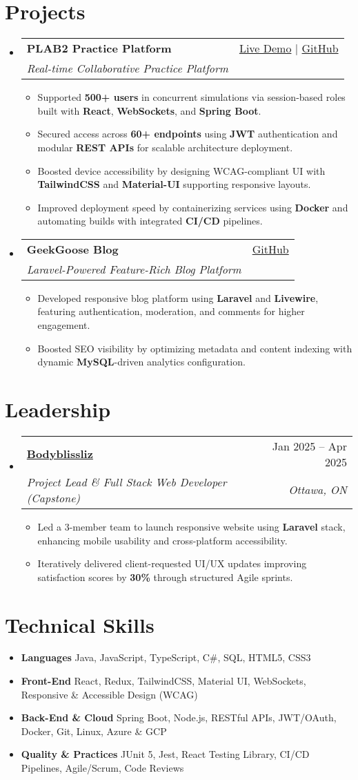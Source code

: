 \documentclass[letterpaper,11pt]{article}
\makeatletter
\newcommand{\resumeItem}[1]{\item\small{#1 \vspace{-2pt}}}
\newcommand{\resumeSubheading}[4]{
  \vspace{-1pt}\item
    \begin{tabular*}{0.97\textwidth}[t]{l@{\extracolsep{\fill}}r}
      \textbf{#1} & #2 \\
      \textit{\small#3} & \textit{\small #4} \\
    \end{tabular*}\vspace{-5pt}
}
\newcommand{\resumeSubHeadingListStart}{\begin{itemize}[leftmargin=*]}
\newcommand{\resumeSubHeadingListEnd}{\end{itemize}}
\newcommand{\resumeItemListStart}{\begin{itemize}}
\newcommand{\resumeItemListEnd}{\end{itemize}\vspace{-5pt}}
\makeatother
\begin{document}
\section{Projects}
  \resumeSubHeadingListStart
    \resumeSubheading
      {\textbf{PLAB2 Practice Platform}}{\href{https://plab2practice.com}{Live Demo} | \href{https://github.com/altansaid/plab2projectnew}{GitHub}}
      {Real-time Collaborative Practice Platform}{}
      \resumeItemListStart
        \resumeItem{Supported \textbf{500+ users} in concurrent simulations via session-based roles built with \textbf{React}, \textbf{WebSockets}, and \textbf{Spring Boot}.}
        \resumeItem{Secured access across \textbf{60+ endpoints} using \textbf{JWT} authentication and modular \textbf{REST APIs} for scalable architecture deployment.}
        \resumeItem{Boosted device accessibility by designing WCAG-compliant UI with \textbf{TailwindCSS} and \textbf{Material-UI} supporting responsive layouts.}
        \resumeItem{Improved deployment speed by containerizing services using \textbf{Docker} and automating builds with integrated \textbf{CI/CD} pipelines.}
      \resumeItemListEnd

    \resumeSubheading
      {\textbf{GeekGoose Blog}}{\href{https://github.com/altansaid/geekgoose}{GitHub}}
      {Laravel-Powered Feature-Rich Blog Platform}{}
      \resumeItemListStart
        \resumeItem{Developed responsive blog platform using \textbf{Laravel} and \textbf{Livewire}, featuring authentication, moderation, and comments for higher engagement.}
        \resumeItem{Boosted SEO visibility by optimizing metadata and content indexing with dynamic \textbf{MySQL}-driven analytics configuration.}
      \resumeItemListEnd
  \resumeSubHeadingListEnd

\section{Leadership}
  \resumeSubHeadingListStart
    \resumeSubheading
      {\href{https://www.bodyblissliz.com}{Bodyblissliz}}{Jan 2025 -- Apr 2025}
      {Project Lead \& Full Stack Web Developer (Capstone)}{Ottawa, ON}
      \resumeItemListStart
        \resumeItem{Led a 3-member team to launch responsive website using \textbf{Laravel} stack, enhancing mobile usability and cross-platform accessibility.}
        \resumeItem{Iteratively delivered client-requested UI/UX updates improving satisfaction scores by \textbf{30\%} through structured Agile sprints.}
      \resumeItemListEnd
  \resumeSubHeadingListEnd

\section{Technical Skills}
  \resumeItemListStart
    \resumeItem{\textbf{Languages}}{Java, JavaScript, TypeScript, C\#, SQL, HTML5, CSS3}
    \resumeItem{\textbf{Front-End}}{React, Redux, TailwindCSS, Material UI, WebSockets, Responsive \& Accessible Design (WCAG)}
    \resumeItem{\textbf{Back-End \& Cloud}}{Spring Boot, Node.js, RESTful APIs, JWT/OAuth, Docker, Git, Linux, Azure \& GCP}
    \resumeItem{\textbf{Quality \& Practices}}{JUnit 5, Jest, React Testing Library, CI/CD Pipelines, Agile/Scrum, Code Reviews}
  \resumeItemListEnd
\end{document}
